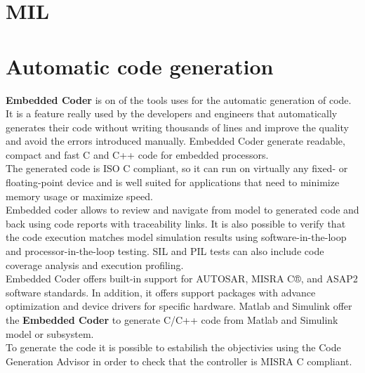\documentclass[12pt,a4paper]{report}
\begin{document}
\section{MIL}

\section{Automatic code generation}
\textbf{Embedded Coder} is on of the tools uses for the automatic generation of code. It is a feature really used by the developers and engineers that automatically generates their code without writing thousands of lines and improve the quality and avoid the errors introduced manually. 
Embedded Coder generate readable, compact and fast C and C++ code for embedded processors. \\
The generated code is ISO C compliant, so it can run on virtually any fixed- or floating-point device and is well suited for applications that need to minimize memory usage or maximize speed. \\
Embedded coder allows to review and navigate from model to generated code and back using code reports with traceability links. It is also possible to verify that the code execution matches model simulation results using software-in-the-loop and processor-in-the-loop testing. SIL and PIL tests can also include code coverage analysis and execution profiling. \\
Embedded Coder offers built-in support for AUTOSAR, MISRA C®, and ASAP2 software standards. In addition, it offers support packages with advance optimization and device drivers for specific hardware.
Matlab and Simulink offer the \textbf{Embedded Coder} to generate C/C++ code from Matlab and Simulink model or subsystem. \\
To generate the code it is possible to estabilish the objectivies using the Code Generation Advisor in order to check that the controller is MISRA C compliant.\\
\end{document}

